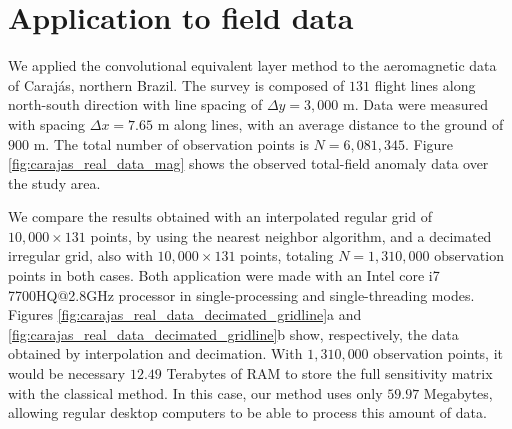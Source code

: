 \section{Application to field data}

We applied the convolutional equivalent layer method to the aeromagnetic data of Carajás, 
northern Brazil.
The survey is composed of $131$ flight lines along north-south direction with line spacing of 
$\Delta y = 3,000$ m. 
Data were measured with spacing $\Delta x = 7.65$ m along lines, with an average distance 
to the ground of $900$ m.%
The total number of observation points is $N = 6,081,345$. Figure \ref{fig:carajas_real_data_mag} 
shows the observed total-field anomaly data over the study area.

We compare the results obtained with an interpolated regular grid of $10,000 \times 131$ points, 
by using the nearest neighbor algorithm, and a decimated irregular grid, also with $10,000 \times 131$
points, totaling $N = 1,310,000$ observation points in both cases. 
Both application were made with an Intel core i7 7700HQ@2.8GHz processor in single-processing and 
single-threading modes. 
Figures \ref{fig:carajas_real_data_decimated_gridline}a and 
\ref{fig:carajas_real_data_decimated_gridline}b show, respectively, the data obtained by interpolation
and decimation. 
With $1,310,000$ observation points, it would be necessary $12.49$ Terabytes of RAM to store the full
sensitivity matrix with the classical method. 
In this case, our method uses only $59.97$ Megabytes, allowing regular desktop computers to be able 
to process this amount of data.

